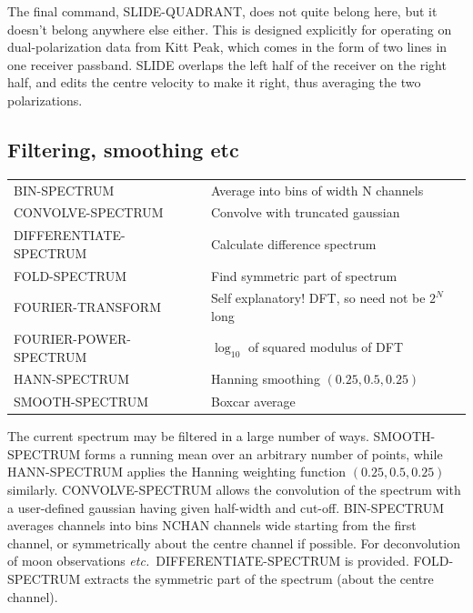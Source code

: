 \documentclass[11pt,twoside]{report}
\newcommand{\etc}{{\it etc.\,}}
\begin{document}
The final command, SLIDE-QUADRANT, does not quite belong here, but it doesn't
belong anywhere else either. This is designed explicitly for operating on
dual-polarization data from Kitt Peak, which comes in the form of two lines
in one receiver passband. SLIDE overlaps the left half of the receiver on the
right half, and edits the centre velocity to make it right, thus averaging
the two polarizations.

\subsection{Filtering, smoothing etc}  

\begin{tabular}{ll}
BIN-SPECTRUM             & Average into bins of width N channels\\
CONVOLVE-SPECTRUM        & Convolve with truncated gaussian\\
DIFFERENTIATE-SPECTRUM   & Calculate difference spectrum\\
FOLD-SPECTRUM            & Find symmetric part of spectrum\\
FOURIER-TRANSFORM        & Self explanatory! DFT, so need not be $2^N$ long\\
FOURIER-POWER-SPECTRUM   & $\log_{10}$ of squared modulus of DFT\\
HANN-SPECTRUM            & Hanning smoothing $(0.25,0.5,0.25)$\\
SMOOTH-SPECTRUM          & Boxcar average\\
\end{tabular}

The current spectrum may be filtered in a large number of ways. SMOOTH-SPECTRUM
forms a running mean  over an arbitrary number of points,
while HANN-SPECTRUM applies the Hanning  weighting function
$(0.25, 0.5, 0.25)$ similarly. CONVOLVE-SPECTRUM allows the convolution
of the spectrum with a user-defined gaussian
having given half-width and cut-off. BIN-SPECTRUM  averages
channels into bins NCHAN channels wide starting from the first channel, or
symmetrically about the centre channel if possible. For deconvolution
 of moon  observations \etc
DIFFERENTIATE-SPECTRUM is provided. FOLD-SPECTRUM extracts the symmetric part
of the spectrum (about
the centre channel).
\end{document}

